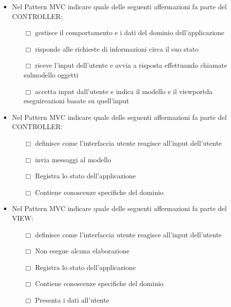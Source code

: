 \documentclass[10pt,twocolumn]{article}
\begin{document}
\begin{itemize}
    \item Nel Pattern MVC indicare quale delle seguenti affermazioni fa parte del CONTROLLER:
          \begin{itemize}
              \item[$\Box$] gestisce il comportamento e i dati del dominio dell'applicazione
              \item[$\Box$] risponde alle richieste di informazioni circa il suo stato
              \item[$\Box$] riceve l'input dell'utente e avvia a risposta effettuando chiamate sulmodello oggetti
              \item[$\Box$] accetta input dall'utente e indica il modello e il viewportda eseguireazioni basate su quell'input
          \end{itemize}
\end{itemize}
\begin{itemize}
    \item Nel Pattern MVC indicare quale delle seguenti affermazioni fa parte del CONTROLLER:
          \begin{itemize}
              \item[$\Box$] definisce come l'interfaccia utente reagisce all'input dell'utente
              \item[$\Box$] invia messaggi al modello
              \item[$\Box$] Registra lo stato dell'applicazione
              \item[$\Box$] Contiene conoscenze specifiche del dominio
          \end{itemize}
\end{itemize}
\begin{itemize}
    \item Nel Pattern MVC indicare quale delle seguenti affermazioni fa parte del VIEW:
          \begin{itemize}
              \item[$\Box$] definisce come l'interfaccia utente reagisce all'input dell'utente
              \item[$\Box$] Non esegue alcuna elaborazione
              \item[$\Box$] Registra lo stato dell'applicazione
              \item[$\Box$] Contiene conoscenze specifiche del dominio
              \item[$\Box$] Presenta i dati all'utente
          \end{itemize}
\end{itemize}
\end{document}
